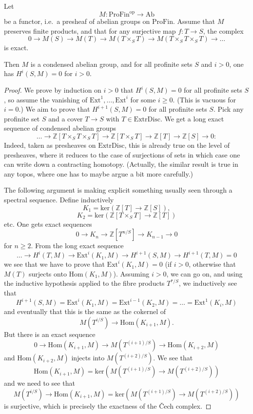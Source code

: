 \begin{proposition}
  \label{acyclic-sheaf}
  Let
  \[ M \colon \mathrm{ProFin}^{\mathrm{op}}\to \mathrm{Ab} \]
  be a functor, i.e.~a presheaf of abelian groups on $\mathrm{ProFin}$. Assume that $M$ preserves finite products, and that for any surjective map $f: T\to S$, the complex
  \[ 0\to M(S)\to M(T)\to M(T\times_S T)\to M(T\times_S T\times_S T)\to \ldots \]
  is exact.

  Then $M$ is a condensed abelian group, and for all profinite sets $S$ and $i>0$, one has $H^i(S,M)=0$ for $i>0$.
\end{proposition}

\begin{proof}
  We prove by induction on $i>0$ that $H^i(S,M)=0$ for all profinite sets $S$, so assume the vanishing of $\mathrm{Ext}^1,\ldots,\mathrm{Ext}^i$ for some $i\geq 0$.
  (This is vacuous for $i=0$.)
  We aim to prove that $H^{i+1}(S,M)=0$ for all profinite sets $S$.
  Pick any profinite set $S$ and a cover $T\to S$ with $T\in \mathrm{ExtrDisc}$.
  We get a long exact sequence of condensed abelian groups
  \[ \ldots\to \mathbb Z[T\times_S T\times_S T]\to \mathbb Z[T\times_S T]\to \mathbb Z[T]\to \mathbb Z[S]\to 0: \]
  Indeed, taken as presheaves on $\mathrm{ExtrDisc}$, this is already true on the level of presheaves,
  where it reduces to the case of surjections of sets in which case one can write down a contracting homotopy.
  (Actually, the similar result is true in any topos, where one has to maybe argue a bit more carefully.)
  
  The following argument is making explicit something usually seen through a spectral sequence. Define inductively
  \[ K_1=\mathrm{ker}(\mathbb Z[T]\to \mathbb Z[S]), \]
  \[ K_2=\mathrm{ker}(\mathbb Z[T\times_S T]\to \mathbb Z[T]) \]
  etc. One gets exact sequences
  \[ 0\to K_n\to \mathbb Z[T^{n/S}]\to K_{n-1}\to 0 \]
  for $n\geq 2$. From the long exact sequence
  \[ \ldots\to H^i(T,M)\to \mathrm{Ext}^i(K_1,M)\to H^{i+1}(S,M)\to H^{i+1}(T,M)=0 \]
  we see that we have to prove that $\mathrm{Ext}^i(K_1,M)=0$ (if $i>0$, otherwise that $M(T)$ surjects onto $\mathrm{Hom}(K_1,M)$).
  Assuming $i>0$, we can go on, and using the inductive hypothesis applied to the fibre products $T^{\ast/S}$, we inductively see that
  \[ H^{i+1}(S,M)=\mathrm{Ext}^i(K_1,M)=\mathrm{Ext}^{i-1}(K_2,M)=\ldots=\mathrm{Ext}^1(K_i,M) \]
  and eventually that this is the same as the cokernel of
  \[ M(T^{i/S})\to \mathrm{Hom}(K_{i+1},M).  \]
  But there is an exact sequence
  \[ 0\to \mathrm{Hom}(K_{i+1},M)\to M(T^{(i+1)/S})\to \mathrm{Hom}(K_{i+2},M) \]
  and $\mathrm{Hom}(K_{i+2},M)$ injects into $M(T^{(i+2)/S})$. We see that
  \[ \mathrm{Hom}(K_{i+1},M)=\mathrm{ker}(M(T^{(i+1)/S})\to M(T^{(i+2)/S})) \]
  and we need to see that
  \[ M(T^{i/S})\to \mathrm{Hom}(K_{i+1},M)=\mathrm{ker}(M(T^{(i+1)/S})\to M(T^{(i+2)/S})) \]
  is surjective, which is precisely the exactness of the \v{C}ech complex.
\end{proof}

